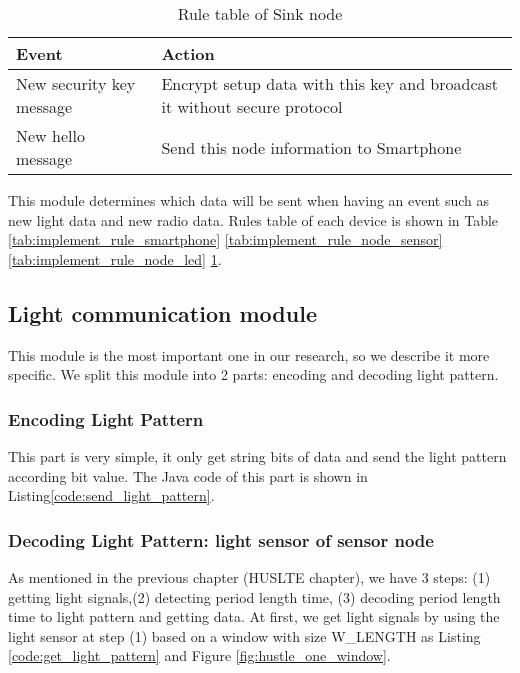 \begin{table}[hp]
\caption{Rule table of Sink node}
\label{tab:implement_rule_sink}
\begin{center}
\begin{tabular}{|p{5cm}|p{8cm}|}
\hline
Event&Action\\
\hline
{New security key message}&{Encrypt setup data with this key and broadcast it without secure protocol}\\
\hline
{New hello message}&{Send this node information to Smartphone}\\
\hline
\end{tabular}
\end{center}

\end{table}%

This module determines which data will be sent when having an event such as new light data and new radio data. Rules table of each device is shown in Table \ref{tab:implement_rule_smartphone} \ref{tab:implement_rule_node_sensor} \ref{tab:implement_rule_node_led} \ref{tab:implement_rule_sink}.

\subsection{Light communication module}
This module is the most important one in our research, so we describe it more specific.
We split this module into 2 parts: encoding and decoding light pattern.

\subsubsection{Encoding Light Pattern}

This part is very simple, it only get string bits of data and send the light pattern according bit value. The Java code of this part is shown in Listing\ref{code:send_light_pattern}.



\subsubsection{Decoding Light Pattern: light sensor of sensor node}

As mentioned in the previous chapter (HUSLTE chapter), we have 3 steps: (1) getting light signals,(2) detecting period length time, (3) decoding period length time to light pattern and getting data. At first, we get light signals by using the light sensor at step (1) based on a window with size W\_LENGTH as Listing \ref{code:get_light_pattern} and Figure \ref{fig:hustle_one_window}.

